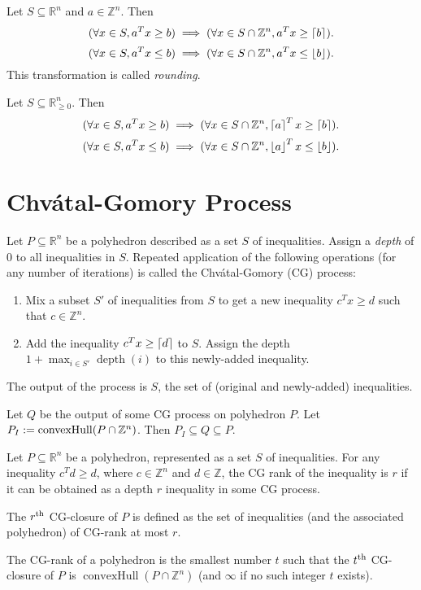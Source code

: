 \documentclass[a4paper,12pt,fleqn]{article}
\newenvironment*{tightenum}{\begin{enumerate}[noitemsep]}{\end{enumerate}}
\DeclareMathOperator{\convexHull}{convexHull}
\DeclareMathOperator{\depth}{depth}
\begin{document}
\begin{lemma}[Rounding]
\label{thm:rounding-is-valid}
Let $S \subseteq \mathbb{R}^n$ and $a \in \mathbb{Z}^n$. Then
\[ (\forall x \in S, a^Tx \ge b) \implies (\forall x \in S \cap \mathbb{Z}^n, a^Tx \ge \left\lceil b \right\rceil). \]
\[ (\forall x \in S, a^Tx \le b) \implies (\forall x \in S \cap \mathbb{Z}^n, a^Tx \le \left\lfloor b \right\rfloor). \]
This transformation is called \emph{rounding}.
\end{lemma}
\begin{corollary}
\label{thm:porth-rounding-is-valid}
Let $S \subseteq \mathbb{R}^n_{\ge 0}$. Then
\[ (\forall x \in S, a^Tx \ge b) \implies (\forall x \in S \cap \mathbb{Z}^n, \left\lceil a \right\rceil^Tx \ge \left\lceil b \right\rceil). \]
\[ (\forall x \in S, a^Tx \le b) \implies (\forall x \in S \cap \mathbb{Z}^n, \left\lfloor a \right\rfloor^Tx \le \left\lfloor b \right\rfloor). \]
\end{corollary}

\section{\texorpdfstring{Chv\'atal}{Chvatal}-Gomory Process}

\begin{definition}
Let $P \subseteq \mathbb{R}^n$ be a polyhedron described as a set $S$ of inequalities.
Assign a \emph{depth} of 0 to all inequalities in $S$.
Repeated application of the following operations (for any number of iterations)
is called the Chv\'atal-Gomory (CG) process:
\begin{tightenum}
\item Mix a subset $S'$ of inequalities from $S$ to get a new inequality $c^Tx \ge d$
    such that $c \in \mathbb{Z}^n$.
\item Add the inequality $c^Tx \ge \left\lceil d \right\rceil$ to $S$.
    Assign the depth $1 + \max_{i \in S'} \depth(i)$ to this newly-added inequality.
\end{tightenum}
The output of the process is $S$, the set of (original and newly-added) inequalities.
\end{definition}

\begin{lemma}
Let $Q$ be the output of some CG process on polyhedron $P$.
Let $P_I \defeq \convexHull(P \cap \mathbb{Z}^n)$.
Then $P_I \subseteq Q \subseteq P$.
\end{lemma}

\begin{definition}
Let $P \subseteq \mathbb{R}^n$ be a polyhedron, represented as a set $S$ of inequalities.
For any inequality $c^Td \ge d$, where $c \in \mathbb{Z}^n$ and $d \in \mathbb{Z}$,
the CG rank of the inequality is $r$ if it can be obtained as a depth $r$
inequality in some CG process.

The $r^{\textrm{th}}$ CG-closure of $P$ is defined as the set of inequalities (and the associated polyhedron)
of CG-rank at most $r$.

The CG-rank of a polyhedron is the smallest number $t$ such that the $t^{\textrm{th}}$ CG-closure
of $P$ is $\convexHull(P \cap \mathbb{Z}^n)$ (and $\infty$ if no such integer $t$ exists).
\end{definition}
\end{document}
